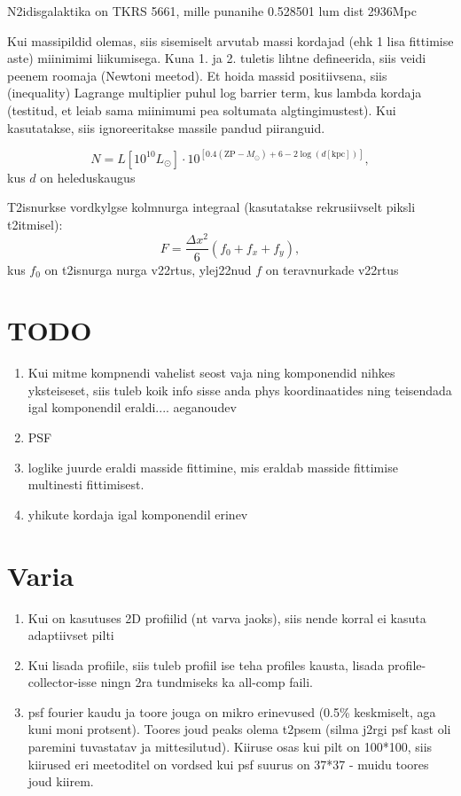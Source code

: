 \documentclass{article}
\begin{document}
	N2idisgalaktika on TKRS 5661, mille punanihe 0.528501 lum dist 2936Mpc
	
	Kui massipildid olemas, siis sisemiselt arvutab massi kordajad (ehk 1 lisa fittimise aste) miinimimi liikumisega. Kuna 1. ja 2. tuletis lihtne defineerida, siis veidi peenem roomaja (Newtoni meetod). Et hoida massid positiivsena, siis (inequality) Lagrange multiplier puhul log barrier term, kus lambda kordaja (testitud, et leiab sama miinimumi pea soltumata algtingimustest). Kui kasutatakse, siis ignoreeritakse massile pandud piiranguid. 
	
	
	\begin{equation}
		N = L\left[ 10^{10}L_\odot \right] \cdot 10^{\left[ 0.4(\mathrm{ZP}-M_\odot) +6 - 2\log(d[\mathrm{kpc}]) \right]},
	\end{equation}
	kus $d$ on heleduskaugus
	
	T2isnurkse vordkylgse kolmnurga integraal (kasutatakse rekrusiivselt piksli t2itmisel):
	\begin{equation}
		F = \frac{\Delta x^2}{6}(f_0+f_x+f_y),
	\end{equation}
	kus $f_0$ on t2isnurga nurga v22rtus, ylej22nud $f$ on teravnurkade v22rtus
	
	
	
	
	
	\section{TODO} %
	\label{sec:todo}
	\begin{enumerate}
		\item Kui mitme kompnendi vahelist seost vaja ning komponendid nihkes yksteiseset, siis tuleb koik info sisse anda phys koordinaatides ning teisendada igal komponendil eraldi.... aeganoudev
		\item PSF
		\item loglike juurde eraldi masside fittimine, mis eraldab masside fittimise multinesti fittimisest.
		\item yhikute kordaja igal komponendil erinev
	\end{enumerate}
	
	\section{Varia}
	\begin{enumerate}
		\item Kui on kasutuses 2D profiilid (nt varva jaoks), siis nende korral ei kasuta adaptiivset pilti
		\item Kui lisada profiile, siis tuleb profiil ise teha profiles kausta, lisada profile-collector-isse ningn 2ra tundmiseks ka all-comp faili.
		\item psf fourier kaudu ja toore jouga on mikro erinevused (0.5\% keskmiselt, aga kuni moni protsent). Toores joud peaks olema t2psem (silma j2rgi psf kast oli paremini tuvastatav ja mittesilutud). Kiiruse osas kui pilt on 100*100, siis kiirused eri meetoditel on vordsed kui psf suurus on 37*37 - muidu toores joud kiirem.
	\end{enumerate}
\end{document}
